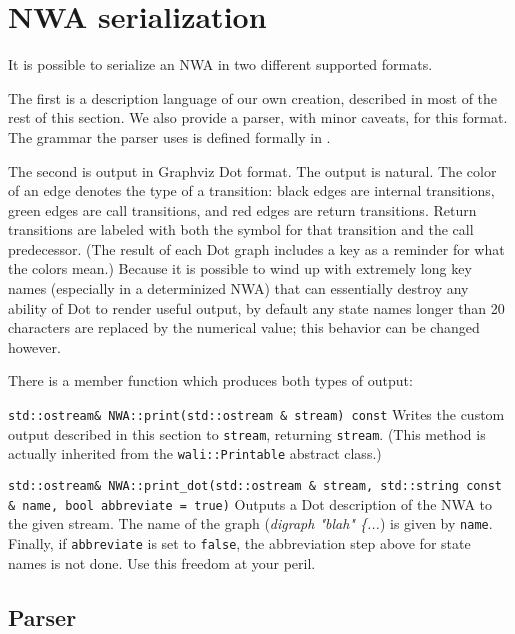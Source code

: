 \section{NWA serialization}

It is possible to serialize an NWA in two different supported
formats.

The first is a description language of our own creation, described in
most of the rest of this section. We also provide a parser, with minor
caveats, for this format. The grammar the parser uses is defined
formally in .

The second is output in Graphviz Dot format. The output is
natural. The color of an edge denotes the type of a transition: black
edges are internal transitions, green edges are call transitions, and
red edges are return transitions. Return transitions are labeled with
both the symbol for that transition and the call predecessor. (The
result of each Dot graph includes a key as a reminder for what the
colors mean.) Because it is possible to wind up with extremely long
key names (especially in a determinized NWA) that can essentially
destroy any ability of Dot to render useful output, by default any
state names longer than 20 characters are replaced by the numerical
value; this behavior can be changed however.

There is a member function which produces both types of output:
\begin{description}
  \item\texttt{std::ostream\& NWA::print(std::ostream \& stream) const}
    Writes the custom output described in this section
    to \texttt{stream}, returning \texttt{stream}.
    (This method is actually inherited from
    the \texttt{wali::Printable} abstract class.)

  \item\texttt{std::ostream\& NWA::print\_dot(std::ostream \& stream,
    std::string const \& name, bool abbreviate = true)} Outputs a Dot
    description of the NWA to the given stream. The name of the graph
    (\textsl{digraph "blah" \{...}) is given
    by \texttt{name}. Finally, if \texttt{abbreviate} is set
    to \texttt{false}, the abbreviation step above for state names is
    not done. Use this freedom at your peril.
\end{description}

\subsection{Parser}
\label{Se:parser}

